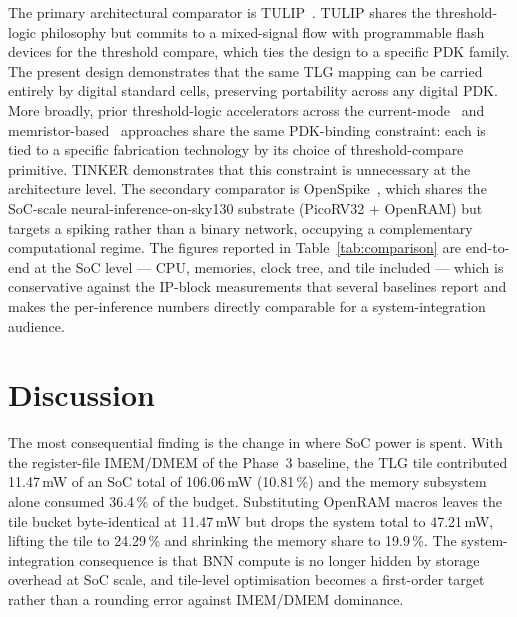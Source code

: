 \documentclass[conference]{IEEEtran}
\begin{document}
The primary architectural comparator is TULIP~\cite{tulip}. TULIP
shares the threshold-logic philosophy but commits to a mixed-signal
flow with programmable flash devices for the threshold compare,
which ties the design to a specific PDK family. The present design
demonstrates that the same TLG mapping can be carried entirely by
digital standard cells, preserving portability across any digital
PDK. More broadly, prior threshold-logic accelerators across the
current-mode~\cite{beiu2003differential} and
memristor-based~\cite{papandroulidakis2019practical} approaches
share the same PDK-binding constraint: each is tied to a specific
fabrication technology by its choice of threshold-compare
primitive. TINKER demonstrates that this constraint is unnecessary
at the architecture level. The secondary comparator is
OpenSpike~\cite{openspike}, which shares the SoC-scale
neural-inference-on-sky130 substrate (PicoRV32 + OpenRAM) but
targets a spiking rather than a binary network, occupying a
complementary computational regime.
The figures reported in
Table~\ref{tab:comparison} are end-to-end at the SoC level --- CPU,
memories, clock tree, and tile included --- which is conservative
against the IP-block measurements that several baselines report and
makes the per-inference numbers directly comparable for a
system-integration audience.


\section{Discussion}
\label{sec:discussion}

The most consequential finding is the change in where SoC power is
spent. With the register-file IMEM/DMEM of the Phase~3 baseline, the
TLG tile contributed 11.47\,mW of an SoC total of 106.06\,mW
(10.81\,\%) and the memory subsystem alone consumed 36.4\,\% of the
budget. Substituting OpenRAM macros leaves the tile bucket
byte-identical at 11.47\,mW but drops the system total to 47.21\,mW,
lifting the tile to 24.29\,\% and shrinking the memory share to
19.9\,\%. The system-integration consequence is that BNN compute is
no longer hidden by storage overhead at SoC scale, and tile-level
optimisation becomes a first-order target rather than a rounding
error against IMEM/DMEM dominance.
\end{document}
